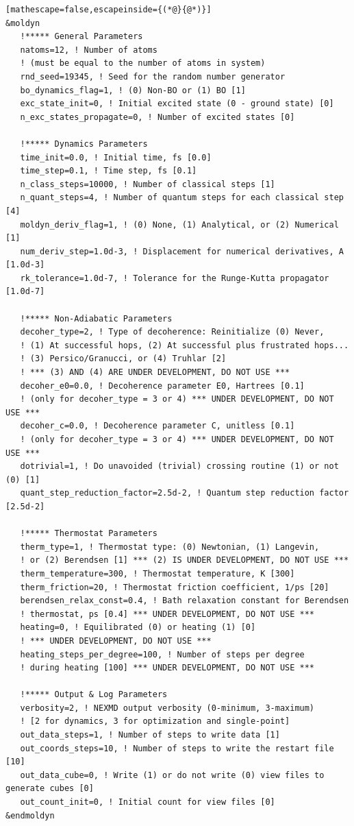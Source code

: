 \documentclass[letterpaper,12pt,titlepage]{article}
\begin{document}
\begin{appendix}
\begin{lstlisting}[mathescape=false,escapeinside={(*@}{@*)}]
&moldyn
   !***** General Parameters
   natoms=12, ! Number of atoms 
   ! (must be equal to the number of atoms in system)
   rnd_seed=19345, ! Seed for the random number generator
   bo_dynamics_flag=1, ! (0) Non-BO or (1) BO [1]
   exc_state_init=0, ! Initial excited state (0 - ground state) [0]
   n_exc_states_propagate=0, ! Number of excited states [0]

   !***** Dynamics Parameters
   time_init=0.0, ! Initial time, fs [0.0]
   time_step=0.1, ! Time step, fs [0.1]
   n_class_steps=10000, ! Number of classical steps [1]
   n_quant_steps=4, ! Number of quantum steps for each classical step [4]
   moldyn_deriv_flag=1, ! (0) None, (1) Analytical, or (2) Numerical [1]
   num_deriv_step=1.0d-3, ! Displacement for numerical derivatives, A [1.0d-3]
   rk_tolerance=1.0d-7, ! Tolerance for the Runge-Kutta propagator [1.0d-7]

   !***** Non-Adiabatic Parameters
   decoher_type=2, ! Type of decoherence: Reinitialize (0) Never, 
   ! (1) At successful hops, (2) At successful plus frustrated hops... 
   ! (3) Persico/Granucci, or (4) Truhlar [2]
   ! *** (3) AND (4) ARE UNDER DEVELOPMENT, DO NOT USE ***
   decoher_e0=0.0, ! Decoherence parameter E0, Hartrees [0.1]
   ! (only for decoher_type = 3 or 4) *** UNDER DEVELOPMENT, DO NOT USE ***
   decoher_c=0.0, ! Decoherence parameter C, unitless [0.1]
   ! (only for decoher_type = 3 or 4) *** UNDER DEVELOPMENT, DO NOT USE ***
   dotrivial=1, ! Do unavoided (trivial) crossing routine (1) or not (0) [1]
   quant_step_reduction_factor=2.5d-2, ! Quantum step reduction factor [2.5d-2]

   !***** Thermostat Parameters
   therm_type=1, ! Thermostat type: (0) Newtonian, (1) Langevin, 
   ! or (2) Berendsen [1] *** (2) IS UNDER DEVELOPMENT, DO NOT USE ***
   therm_temperature=300, ! Thermostat temperature, K [300]
   therm_friction=20, ! Thermostat friction coefficient, 1/ps [20]
   berendsen_relax_const=0.4, ! Bath relaxation constant for Berendsen 
   ! thermostat, ps [0.4] *** UNDER DEVELOPMENT, DO NOT USE ***
   heating=0, ! Equilibrated (0) or heating (1) [0]
   ! *** UNDER DEVELOPMENT, DO NOT USE ***
   heating_steps_per_degree=100, ! Number of steps per degree
   ! during heating [100] *** UNDER DEVELOPMENT, DO NOT USE ***

   !***** Output & Log Parameters
   verbosity=2, ! NEXMD output verbosity (0-minimum, 3-maximum)
   ! [2 for dynamics, 3 for optimization and single-point]
   out_data_steps=1, ! Number of steps to write data [1]
   out_coords_steps=10, ! Number of steps to write the restart file [10]
   out_data_cube=0, ! Write (1) or do not write (0) view files to generate cubes [0]
   out_count_init=0, ! Initial count for view files [0]
&endmoldyn


\end{lstlisting}
\end{appendix}
\end{document}
